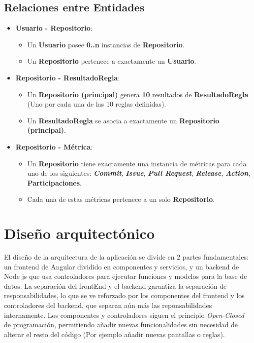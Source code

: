 \subsection{Relaciones entre Entidades}
\begin{itemize}
	\item \textbf{Usuario - Repositorio}:
	\begin{itemize}
		\item Un \textbf{Usuario} posee \textbf{0..n} instancias de \textbf{Repositorio}.
		\item Un \textbf{Repositorio} pertenece a exactamente un \textbf{Usuario}.
	\end{itemize}

    \item \textbf{Repositorio - ResultadoRegla}:
	\begin{itemize}
		\item Un \textbf{Repositorio (principal)} genera \textbf{10} resultados de \textbf{ResultadoRegla} (Uno por cada una de las 10 reglas definidas).
		\item Un \textbf{ResultadoRegla} se asocia a exactamente un \textbf{Repositorio (principal)}.
	\end{itemize}

	\item \textbf{Repositorio - Métrica}:
	\begin{itemize}
		\item Un \textbf{Repositorio} tiene exactamente una instancia de métricas para cada uno de los siguientes: \textbf{\textit{Commit}}, \textbf{\textit{Issue}}, \textbf{\textit{Pull Request}}, \textbf{\textit{Release}}, \textbf{\textit{Action}}, \textbf{Participaciones}.
		\item Cada una de estas métricas pertenece a un solo \textbf{Repositorio}.
	\end{itemize}
\end{itemize}

\section{Diseño arquitectónico}

El diseño de la arquitectura de la aplicación se divide en 2 partes fundamentales: un frontend de Angular dividido en componentes y servicios, y un backend de Node js que usa controladores para ejecutar funciones y modelos para la base de datos. La separación del frontEnd y el backend garantiza la separación de responsabilidades, lo que se ve reforzado por los componentes del frontend y los controladores del backend, que separan aún más las reponsabilidades internamente. Los componentes y controladores siguen el principio \textit{Open-Closed} de programación, permitiendo añadir nuevas funcionalidades sin necesidad de alterar el resto del código (Por ejemplo añadir nuevas pantallas o reglas).

